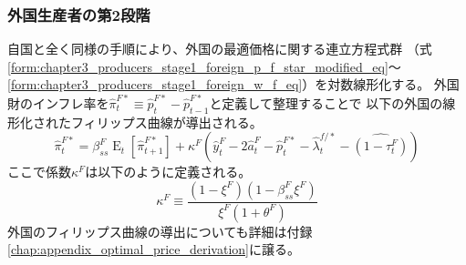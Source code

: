 \subsubsection{外国生産者の第2段階}
\label{sec:chapter3_producers_stage2_foreign}
自国と全く同様の手順により、外国の最適価格に関する連立方程式群
（式\ref{form:chapter3_producers_stage1_foreign_p_f_star_modified_eq}〜
\ref{form:chapter3_producers_stage1_foreign_w_f_eq}）を対数線形化する。
外国財のインフレ率を\(\hat{\pi}_t^{F*}\equiv\hat{p}_t^{F*}-\hat{p}_{t-1}^{F*}\)と定義して整理することで
以下の外国の線形化されたフィリップス曲線が導出される。
\begin{equation}
\label{form:chapter3_producers_stage2_foreign_nkpc_eq}
    \hat{\pi}_t^{F*}=\beta_{ss}^F\operatorname{E}_t[\hat{\pi}_{t+1}^{F*}]+\kappa^F\left(\hat{y}_t^F-2\hat{a}_t^F-\hat{p}_t^{F*}-\hat{\lambda}_t^{f/*}-\widehat{(1-\tau_t^F)}\right)
\end{equation}
ここで係数\(\kappa^F\)は以下のように定義される。
\begin{equation}
\label{form:chapter3_producers_stage2_foreign_kappa_eq}
    \kappa^F\equiv\frac{(1-\xi^F)(1-\beta_{ss}^F\xi^F)}{\xi^F(1+\theta^F)}
\end{equation}
外国のフィリップス曲線の導出についても詳細は付録\ref{chap:appendix_optimal_price_derivation}に譲る。